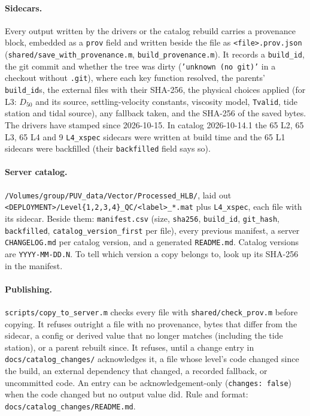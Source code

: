 \documentclass[11pt]{article}
\newcommand{\code}[1]{\texttt{#1}}
\begin{document}
\paragraph{Sidecars.} Every output written by the drivers or the catalog rebuild carries a
provenance block, embedded as a \code{prov} field and written beside the file as
\code{<file>.prov.json} (\code{shared/save\_with\_provenance.m}, \code{build\_provenance.m}). It
records a \code{build\_id}, the git commit and whether the tree was dirty (\code{'unknown (no
git)'} in a checkout without \code{.git}), where each key function resolved, the parents'
\code{build\_id}s, the external files with their SHA-256, the physical choices applied (for L3:
$D_{50}$ and its source, settling-velocity constants, viscosity model, \code{Tvalid}, tide
station and tidal source), any fallback taken, and the SHA-256 of the saved bytes. The drivers
have stamped since 2026-10-15. In catalog 2026-10-14.1 the 65 L2, 65 L3, 65 L4 and 9
\code{L4\_xspec} sidecars were written at build time and the 65 L1 sidecars were backfilled
(their \code{backfilled} field says so).

\paragraph{Server catalog.} \code{/Volumes/group/PUV\_data/Vector/Processed\_HLB/}, laid out
\code{<DEPLOYMENT>/Level\{1,2,3,4\}\_QC/<label>\_*.mat} plus \code{L4\_xspec}, each file with its
sidecar. Beside them: \code{manifest.csv} (size, \code{sha256}, \code{build\_id},
\code{git\_hash}, \code{backfilled}, \code{catalog\_version\_first} per file), every previous
manifest, a server \code{CHANGELOG.md} per catalog version, and a generated \code{README.md}.
Catalog versions are \code{YYYY-MM-DD.N}. To tell which version a copy belongs to, look up its
SHA-256 in the manifest.

\paragraph{Publishing.} \code{scripts/copy\_to\_server.m} checks every file with
\code{shared/check\_prov.m} before copying. It refuses outright a file with no provenance, bytes
that differ from the sidecar, a config or derived value that no longer matches (including the
tide station), or a parent rebuilt since. It refuses, until a change entry in
\code{docs/catalog\_changes/} acknowledges it, a file whose level's code changed since the build,
an external dependency that changed, a recorded fallback, or uncommitted code. An entry can be
acknowledgement-only (\code{changes: false}) when the code changed but no output value did. Rule
and format: \code{docs/catalog\_changes/README.md}.
\end{document}
